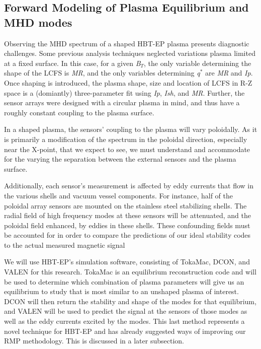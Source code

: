 \documentclass[aps,preprint,showpacs,superscriptaddress,groupedaddress]{revtex4}  %
\begin{document}
\subsection{Forward Modeling of Plasma Equilibrium and MHD modes}
	Observing the MHD spectrum of a shaped HBT-EP plasma presents diagnostic challenges.  Some previous analysis techniques neglected variations plasma limited at a fixed surface.  In this case, for a given \textit{B$_T$}, the only variable determining the shape of the LCFS is \textit{MR}, and the only variables determining  \textit{q$^*$} are \textit{MR} and \textit{Ip}. Once shaping is introduced, the plasma shape, size and location of LCFS in R-Z space is a (domiantly) three-parameter fit using \textit{Ip}, \textit{Ish}, and \textit{MR}.  Further, the sensor arrays were designed with a circular plasma in mind, and thus have a roughly constant coupling to the plasma surface.\par
	In a shaped plasma, the sensors' coupling to the plasma will vary poloidally.  As it is primarily a modification of the spectrum in the poloidal direction, especially near the X-point, that we expect to see, we must understand and accommodate for the varying the separation between the external sensors and the plasma surface.\par
	Additionally, each sensor's measurement is affected by eddy currents that flow in the various shells and vacuum vessel components.  For instance, half of the poloidal array sensors are mounted on the stainless steel stabilizing shells.  The radial field of high frequency modes at these sensors will be attenuated, and the poloidal field enhanced, by eddies in these shells.  These confounding fields must be accounted for in order to compare the predictions of our ideal stability codes to the actual measured magnetic signal\par
	We will use HBT-EP's simulation software, consisting of TokaMac, DCON, and VALEN for this research.  TokaMac is an equilibrium reconstruction code and will be used to determine which combination of plasma parameters will give us an equilibrium to study that is most similar to an unshaped plasma of interest.  DCON will then return the stability and shape of the modes for that equilibrium, and VALEN will be used to predict the signal at the sensors of those modes as well as the eddy currents excited by the modes.  This last method represents a novel technique for HBT-EP and has already suggested ways of improving our RMP methodology.  This is discussed in a later subsection.
\end{document}
